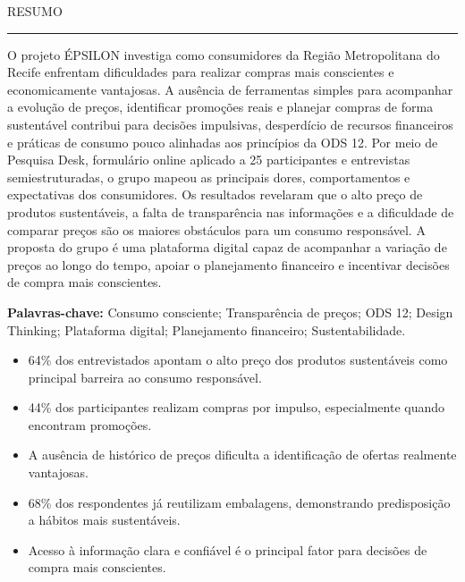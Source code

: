 \documentclass[12pt, a4paper]{article}
\begin{document}
\pagestyle{corpo}

\begin{center}
  {\sffamily\large\color{wineDeep} \MakeUppercase{Resumo}}\\[3pt]
  {\color{wineSoft}\rule{1.8cm}{1pt}}
\end{center}
\vspace{0.5cm}

{\color{ink}
\lettrine[lines=3, lhang=0.08, findent=3pt, nindent=8pt]{\color{wineDeep}\sffamily O}{} projeto ÉPSILON investiga como consumidores da Região Metropolitana do Recife enfrentam dificuldades para realizar compras mais conscientes e economicamente vantajosas. A ausência de ferramentas simples para acompanhar a evolução de preços, identificar promoções reais e planejar compras de forma sustentável contribui para decisões impulsivas, desperdício de recursos financeiros e práticas de consumo pouco alinhadas aos princípios da ODS 12. Por meio de Pesquisa Desk, formulário online aplicado a 25 participantes e entrevistas semiestruturadas, o grupo mapeou as principais dores, comportamentos e expectativas dos consumidores. Os resultados revelaram que o alto preço de produtos sustentáveis, a falta de transparência nas informações e a dificuldade de comparar preços são os maiores obstáculos para um consumo responsável. A proposta do grupo é uma plataforma digital capaz de acompanhar a variação de preços ao longo do tempo, apoiar o planejamento financeiro e incentivar decisões de compra mais conscientes.
\par}

\vspace{6pt}
\noindent\textbf{Palavras-chave:} Consumo consciente; Transparência de preços; ODS 12; Design Thinking; Plataforma digital; Planejamento financeiro; Sustentabilidade.

\vspace{10pt}
\vspace{2pt}

\begin{itemize}[leftmargin=1.2em, itemsep=4pt, label=\textcolor{wineSoft}{\textbf{\textbullet}}]
  \item 64\% dos entrevistados apontam o alto preço dos produtos sustentáveis como principal barreira ao consumo responsável.
  \item 44\% dos participantes realizam compras por impulso, especialmente quando encontram promoções.
  \item A ausência de histórico de preços dificulta a identificação de ofertas realmente vantajosas.
  \item 68\% dos respondentes já reutilizam embalagens, demonstrando predisposição a hábitos mais sustentáveis.
  \item Acesso à informação clara e confiável é o principal fator para decisões de compra mais conscientes.
\end{itemize}
\end{document}

